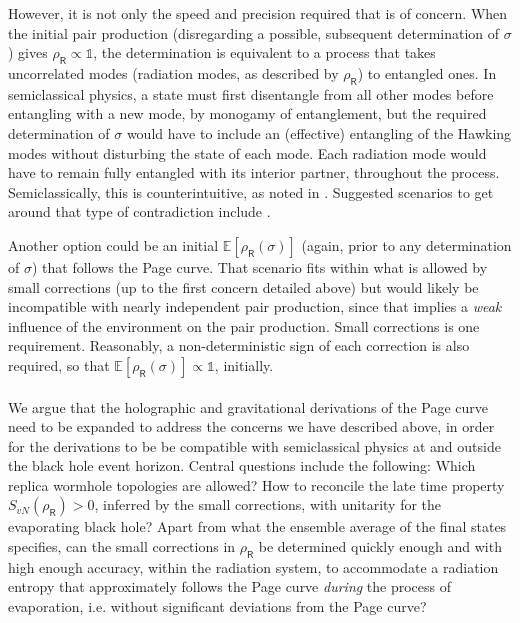 \documentclass[12pt]{article}
\numberwithin{equation}{section}
\begin{document}
However, it is not only the speed and precision required that is of concern. When the initial pair production (disregarding a possible, subsequent determination of $\sigma$) gives $\rho_\textsf{R}\propto\mathbb{1}$, the determination is equivalent to a process that takes uncorrelated modes (radiation modes, as described by $\rho_\textsf{R}$) to entangled ones. In semiclassical physics, a state must first disentangle from all other modes before entangling with a new mode, by monogamy of entanglement, but the required determination of $\sigma$ would have to include an (effective) entangling of the Hawking modes without disturbing the state of each mode. Each radiation mode would have to remain fully entangled with its interior partner, throughout the process. Semiclassically, this is counterintuitive, as noted in \cite{Karlsson:2020uga}. Suggested scenarios to get around that type of contradiction include \cite{Raju:2016vsu,Raju:2018zpn}.

Another option could be an initial $\mathbb{E}[\rho_\textsf{R}(\sigma)]$ (again, prior to any determination of $\sigma$) that follows the Page curve. That scenario fits within what is allowed by small corrections (up to the first concern detailed above) but would likely be incompatible with nearly independent pair production, since that implies a \emph{weak} influence of the environment on the pair production. Small corrections is one requirement. Reasonably, a non-deterministic sign of each correction is also required, so that $\mathbb{E}[\rho_\textsf{R}(\sigma)]\propto\mathbb{1}$, initially.
\\\\
We argue that the holographic and gravitational derivations of the Page curve need to be expanded to address the concerns we have described above, in order for the derivations to be be compatible with semiclassical physics at and outside the black hole event horizon. Central questions include the following: Which replica wormhole topologies are allowed? How to reconcile the late time property $S_{vN}(\rho_\textsf{R})>0$, inferred by the small corrections, with unitarity for the evaporating black hole? Apart from what the ensemble average of the final states specifies, can the small corrections in $\rho_\textsf{R}$ be determined quickly enough and with high enough accuracy, within the radiation system, to accommodate a radiation entropy that approximately follows the Page curve \emph{during} the process of evaporation, i.e. without significant deviations from the Page curve?
\end{document}
